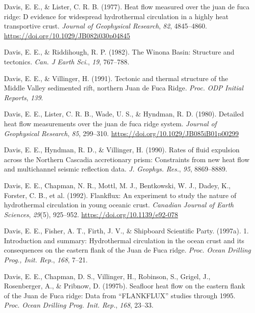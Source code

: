 \begin{CSLReferences}{1}{1}
\leavevmode{}%
Davis, E. E., \& Lister, C. R. B. (1977). Heat flow measured over the juan de fuca ridge: D evidence for widespread hydrothermal circulation in a highly heat transportive crust. \emph{Journal of Geophysical Research}, \emph{82}, 4845--4860. \url{https://doi.org/10.1029/JB082i030p04845}

\leavevmode{}%
Davis, E. E., \& Riddihough, R. P. (1982). The {Winona Basin}: Structure and tectonics. \emph{Can. J Earth Sci.}, \emph{19}, 767--788.

\leavevmode{}%
Davis, E. E., \& Villinger, H. (1991). Tectonic and thermal structure of the {Middle Valley} sedimented rift, northern {Juan de Fuca Ridge}. \emph{Proc. ODP Initial Reports}, \emph{139}.

\leavevmode{}%
Davis, E. E., Lister, C. R. B., Wade, U. S., \& Hyndman, R. D. (1980). Detailed heat flow measurements over the juan de fuca ridge system. \emph{Journal of Geophysical Research}, \emph{85}, 299--310. \url{https://doi.org/10.1029/JB085iB01p00299}

\leavevmode{}%
Davis, E. E., Hyndman, R. D., \& Villinger, H. (1990). Rates of fluid expulsion across the {Northern Cascadia} accretionary prism: Constraints from new heat flow and multichannel seismic reflection data. \emph{J. Geophys. Res.}, \emph{95}, 8869--8889.

\leavevmode{}%
Davis, E. E., Chapman, N. R., Mottl, M. J., Bentkowski, W. J., Dadey, K., Forster, C. B., et al. (1992). Flankflux: An experiment to study the nature of hydrothermal circulation in young oceanic crust. \emph{Canadian Journal of Earth Sciences}, \emph{29}(5), 925--952. \url{https://doi.org/10.1139/e92-078}

\leavevmode{}%
Davis, E. E., Fisher, A. T., Firth, J. V., \& Shipboard Scientific Party. (1997a). 1. Introduction and summary: Hydrothermal circulation in the ocean crust and its consequences on the eastern flank of the {Juan de Fuca} ridge. \emph{Proc. Ocean Drilling Prog., Init. Rep.}, \emph{168}, 7--21.

\leavevmode{}%
Davis, E. E., Chapman, D. S., Villinger, H., Robinson, S., Grigel, J., Rosenberger, A., \& Pribnow, D. (1997b). Seafloor heat flow on the eastern flank of the {Juan de Fuca} ridge: Data from {``FLANKFLUX''} studies through 1995. \emph{Proc. Ocean Drilling Prog. Init. Rep.}, \emph{168}, 23--33.


\end{CSLReferences}
